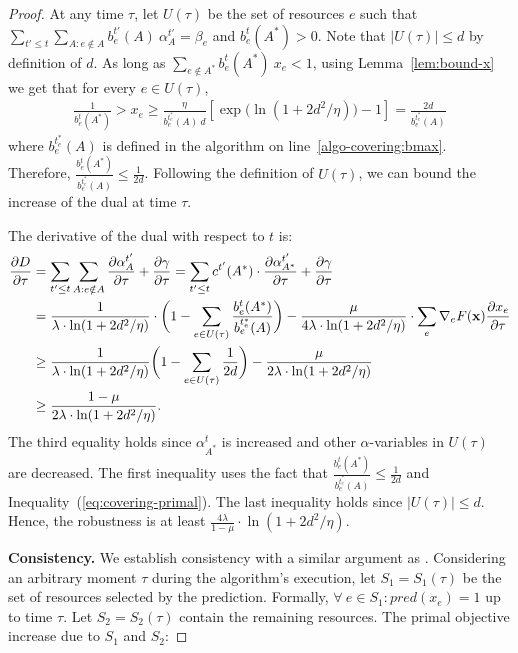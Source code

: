 \begin{proof}
At any time $\tau$, let $U(\tau)$ be the set of resources $e$ such that
$\sum_{t' \le t} \sum_{A: e \notin A} b^{t'}_{e}(A)\ \alpha^{t'}_{A} = \beta_{e}$ and $b^{t}_{e}(A^*) > 0$.
Note that $|U(\tau)| \leq d$ by definition of $d$.
As long as $\sum_{e \notin A^{*}} b^{t}_{e}(A^*)\ x_{e}  < 1$,
using Lemma~\ref{lem:bound-x} we get that for every $e \in U(\tau)$,
%
\begin{align*}
\frac{1}{b^{t}_{e}(A^*)} > x_{e} \geq \frac{\eta}{b^{t_{e}^{*}}_{e}(A) \ d}
				\left[ \exp\biggl(\ln(1+2d^{2}/\eta) \biggr) - 1 \right]
				= \frac{2 d}{b^{t_{e}^{*}}_{e}(A)}
\end{align*}
where $b^{t_{e}^{*}}_{e}(A)$ is defined in the algorithm on line~\ref{algo-covering:bmax}.
Therefore, $\frac{b^{t}_{e}(A^{*})}{b^{t_{e}^{*}}_{e}(A)} \leq \frac{1}{2d}$. Following the definition of $U(\tau)$, we can bound the increase of the dual at time $\tau$.

\noindent The derivative of the dual with respect to $t$ is:
\begin{align*}
\frac{\partial D}{\partial \tau}
&=  \sum_{t' \le t} \sum_{A : e \notin A} \frac{\partial \alpha^{t'}_{A}}{\partial \tau} + \frac{\partial \gamma}{\partial \tau}
= \sum_{t' \le t} c^{t'}(A^{*}) \cdot \frac{\partial \alpha^{t'}_{A^{*}}}{\partial \tau} + \frac{\partial \gamma}{\partial \tau} \\
&= \frac{1}{\lambda \cdot \ln(1 + 2d^{2}/\eta)} \cdot \biggl(1 - \sum_{e \in U(\tau)} \frac{b^{t}_{e}(A^{*})}{b^{t_{e}^{*}}_{e}(A)} \biggr)
	- \frac{\mu}{4\lambda \cdot \ln(1 + 2d^{2}/\eta)} \cdot \sum_{e} \nabla_{e} F(\vect{x}) \frac{\partial x_{e}}{\partial \tau} \\
%
&\geq \frac{1}{\lambda \cdot \ln(1 + 2d^{2}/\eta)} \biggl(1 - \sum_{e \in U(\tau)} \frac{1}{2d} \biggr)
	- \frac{\mu}{2 \lambda \cdot \ln(1 + 2d^{2}/\eta)} \\
%
&\geq \frac{1 - \mu}{2 \lambda \cdot \ln(1 + 2d^{2}/\eta)}.
\end{align*}
The third equality holds since $\alpha^{t}_{A^{*}}$ is increased and other $\alpha$-variables in
$U(\tau)$ are decreased. The first inequality uses the fact that $\frac{b^{t}_{e}(A^{*})}{b^{t_{e}^{*}}_{e}(A)} \leq \frac{1}{2d}$
and Inequality~(\ref{eq:covering-primal}).
The last inequality holds since $|U(\tau)| \leq d$.
Hence, the robustness is at least $\frac{4 \lambda}{1 - \mu} \cdot \ln(1 + 2d^{2}/\eta)$.

\textbf{Consistency.} We establish consistency with a similar argument as \cite{BamasMaggiori20:The-Primal-Dual-method}.
Considering an arbitrary moment $\tau$ during the algorithm's execution, let $S_{1} = S_{1}(\tau)$ be the set of resources selected by the prediction. Formally, $\forall\ e \in S_{1} : pred(x_{e}) = 1$ up to time $\tau$. Let $S_{2} = S_{2}(\tau)$ contain the remaining resources.
The primal objective increase due to $S_{1}$ and $S_{2}$:


\end{proof}
